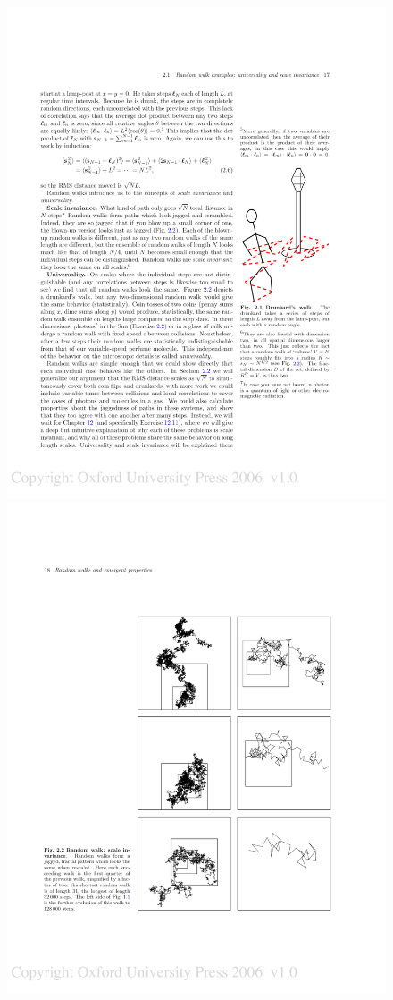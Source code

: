 \documentclass[hyperref={colorlinks=true}]{beamer}
\begin{document}
\begin{frame}
\begin{columns}
      \begin{figure}
        \centering
        \includegraphics[width=0.7\columnwidth]{Drunkard.pdf}\\
        \includegraphics[width=\columnwidth]{RandomWalkFractal.pdf}
      \end{figure}
    
  \end{columns}
  
\end{frame}
\end{document}
